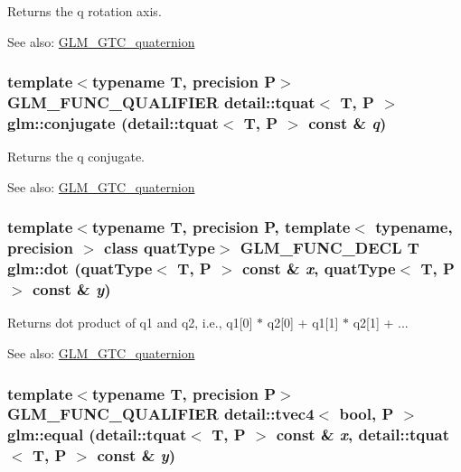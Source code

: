 Returns the q rotation axis.

\begin{Desc}
\item[See also:]\hyperlink{group__gtc__quaternion}{GLM\_\-GTC\_\-quaternion} \end{Desc}
\hypertarget{group__gtc__quaternion_gdbb01a11c8e4f4e0602f6cc649896066}{
\subsubsection[conjugate]{\setlength{\rightskip}{0pt plus 5cm}template$<$typename T, precision P$>$ GLM\_\-FUNC\_\-QUALIFIER detail::tquat$<$ T, P $>$ glm::conjugate (detail::tquat$<$ T, P $>$ const \& {\em q})}}
\label{group__gtc__quaternion_gdbb01a11c8e4f4e0602f6cc649896066}


Returns the q conjugate.

\begin{Desc}
\item[See also:]\hyperlink{group__gtc__quaternion}{GLM\_\-GTC\_\-quaternion} \end{Desc}
\hypertarget{group__gtc__quaternion_g4ce8bce2b7dc8206a31cfb8e7b779b76}{
\subsubsection[dot]{\setlength{\rightskip}{0pt plus 5cm}template$<$typename T, precision P, template$<$ typename, precision $>$ class quatType$>$ GLM\_\-FUNC\_\-DECL T glm::dot (quatType$<$ T, P $>$ const \& {\em x}, \/  quatType$<$ T, P $>$ const \& {\em y})}}
\label{group__gtc__quaternion_g4ce8bce2b7dc8206a31cfb8e7b779b76}


Returns dot product of q1 and q2, i.e., q1\mbox{[}0\mbox{]} $\ast$ q2\mbox{[}0\mbox{]} + q1\mbox{[}1\mbox{]} $\ast$ q2\mbox{[}1\mbox{]} + ...

\begin{Desc}
\item[See also:]\hyperlink{group__gtc__quaternion}{GLM\_\-GTC\_\-quaternion} \end{Desc}
\hypertarget{group__gtc__quaternion_gd867dac3fe25c96ee0cc95a141acd4db}{
\subsubsection[equal]{\setlength{\rightskip}{0pt plus 5cm}template$<$typename T, precision P$>$ GLM\_\-FUNC\_\-QUALIFIER detail::tvec4$<$ bool, P $>$ glm::equal (detail::tquat$<$ T, P $>$ const \& {\em x}, \/  detail::tquat$<$ T, P $>$ const \& {\em y})}}
\label{group__gtc__quaternion_gd867dac3fe25c96ee0cc95a141acd4db}


